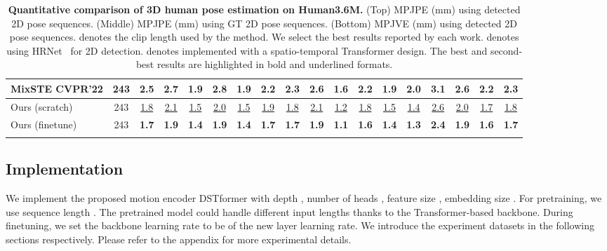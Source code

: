 \begin{table*}[t]
{\begin{tabular}{l c | c c c c c c c c c c c c c c c c}
 MixSTE \cite{zhang2022mixste}  CVPR'22  &        243    & 2.5 & 2.7 & 1.9 & 2.8 & 1.9 & 2.2 & 2.3 & 2.6 & 1.6 & 2.2  & 1.9 & 2.0 & 3.1 & 2.6 & 2.2    & 2.3      \\
\hline
\rowcolor{mygray}
 Ours (scratch)  & 243 & \underline{1.8} & \underline{2.1} & \underline{1.5} & \underline{2.0} & \underline{1.5} & \underline{1.9} & \underline{1.8} & \underline{2.1} & \underline{1.2} & \underline{1.8}          & \underline{1.5} & \underline{1.4} & \underline{2.6} & \underline{2.0} & \underline{1.7}    & \underline{1.8}   \\


\rowcolor{mygray}
 Ours (finetune)  & 243 & \textbf{1.7} & \textbf{1.9} & \textbf{1.4} & \textbf{1.9} & \textbf{1.4} & \textbf{1.7} & \textbf{1.7} & \textbf{1.9} & \textbf{1.1} & \textbf{1.6}         & \textbf{1.4} & \textbf{1.3} & \textbf{2.4} & \textbf{1.9} & \textbf{1.6}    & \textbf{1.7}      \\


\thickhline

\end{tabular}}
\vspace{0.2cm}
\caption{\textbf{Quantitative comparison of 3D human pose estimation on Human3.6M.} 
(Top) MPJPE (mm) using detected 2D pose sequences. (Middle) MPJPE (mm) using GT 2D pose sequences. (Bottom) MPJVE (mm) using detected 2D pose sequences.  denotes the clip length used by the method. We select the best results reported by each work.  denotes using HRNet~\cite{sun2019deep} for 2D detection.  denotes implemented with a spatio-temporal Transformer design. The best and second-best results are highlighted in bold and
underlined formats. 
}
\label{tab:state_of_the_art_h36m}
\end{table*}





\subsection{Implementation}
\label{subsec:implementation}

We implement the proposed motion encoder DSTformer with depth , number of heads , feature size , embedding size . For pretraining, we use sequence length . The pretrained model could handle different input lengths thanks to the Transformer-based backbone. During finetuning, we set the backbone learning rate to be  of the new layer learning rate. We introduce the experiment datasets in the following sections respectively. Please refer to the appendix for more experimental details.


